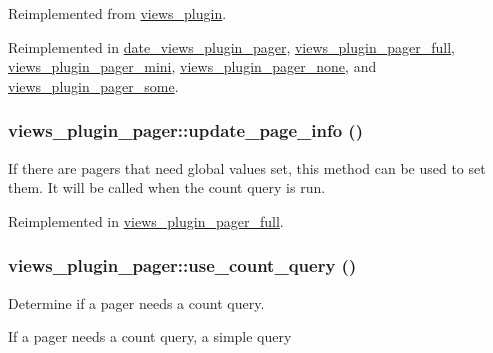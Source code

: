 Reimplemented from \hyperlink{classviews__plugin_a9a4aaece48a7cf465dd95d59a3bc5ea1}{views\_\-plugin}.

Reimplemented in \hyperlink{classdate__views__plugin__pager_a8439f3b4b7c5bf990aff04627d3b38fa}{date\_\-views\_\-plugin\_\-pager}, \hyperlink{classviews__plugin__pager__full_af727d597c4029f7f11721871f7b9c839}{views\_\-plugin\_\-pager\_\-full}, \hyperlink{classviews__plugin__pager__mini_af95c2913ea9b9db423fb0761e543ea09}{views\_\-plugin\_\-pager\_\-mini}, \hyperlink{classviews__plugin__pager__none_abf1170948c1653a9b6e8d4c92273060b}{views\_\-plugin\_\-pager\_\-none}, and \hyperlink{classviews__plugin__pager__some_a2effa2f5a44d1a73a0b53653658d6ed6}{views\_\-plugin\_\-pager\_\-some}.\hypertarget{classviews__plugin__pager_ab4ecbd01ed64c4a6c0079410d8b4dddc}{
\subsubsection[{update\_\-page\_\-info}]{\setlength{\rightskip}{0pt plus 5cm}views\_\-plugin\_\-pager::update\_\-page\_\-info ()}}
\label{classviews__plugin__pager_ab4ecbd01ed64c4a6c0079410d8b4dddc}
If there are pagers that need global values set, this method can be used to set them. It will be called when the count query is run. 

Reimplemented in \hyperlink{classviews__plugin__pager__full_acb15b273f383e8cad63658d4dec52db0}{views\_\-plugin\_\-pager\_\-full}.\hypertarget{classviews__plugin__pager_a693a102e85a9b63bc59057a4efca0d12}{
\subsubsection[{use\_\-count\_\-query}]{\setlength{\rightskip}{0pt plus 5cm}views\_\-plugin\_\-pager::use\_\-count\_\-query ()}}
\label{classviews__plugin__pager_a693a102e85a9b63bc59057a4efca0d12}
Determine if a pager needs a count query.

If a pager needs a count query, a simple query 

